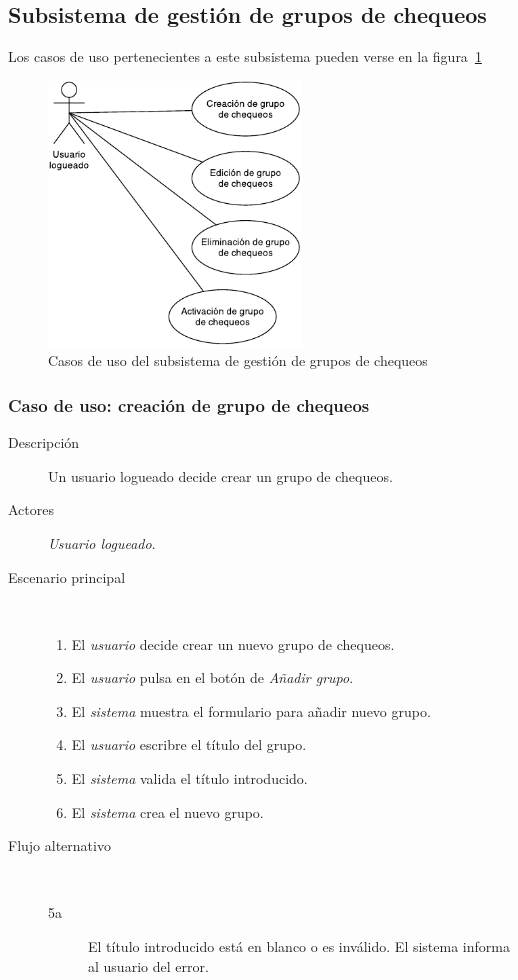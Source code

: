 \subsection{Subsistema de gestión de grupos de chequeos}

Los casos de uso pertenecientes a este subsistema pueden verse en la figura~\ref{fig:subsistema-grupos}

\begin{figure}[hp]
  \centering
  \includegraphics[width=0.6\textwidth]{4_analisis/diagrama_subsistema_gestion_grupos}
  \caption{Casos de uso del subsistema de gestión de grupos de chequeos}
  \label{fig:subsistema-grupos}
\end{figure}

\subsubsection{Caso de uso: creación de grupo de chequeos}

\begin{description}
\item[Descripción] Un usuario logueado decide crear un grupo de chequeos.
\item[Actores] \textit{Usuario logueado}.
\item[Escenario principal] $\quad$
  \begin{enumerate}
  \item El \textit{usuario} decide crear un nuevo grupo de chequeos.
  \item El \textit{usuario} pulsa en el botón de \textit{Añadir grupo}.
  \item El \textit{sistema} muestra el formulario para añadir nuevo grupo.
  \item El \textit{usuario} escribre el título del grupo.
  \item El \textit{sistema} valida el título introducido.
  \item El \textit{sistema} crea el nuevo grupo.
  \end{enumerate}
\item[Flujo alternativo] $\quad$

  \begin{description}
  \item[5a] El título introducido está en blanco o es inválido. El sistema
    informa al usuario del error.
  \end{description}
\end{description}


